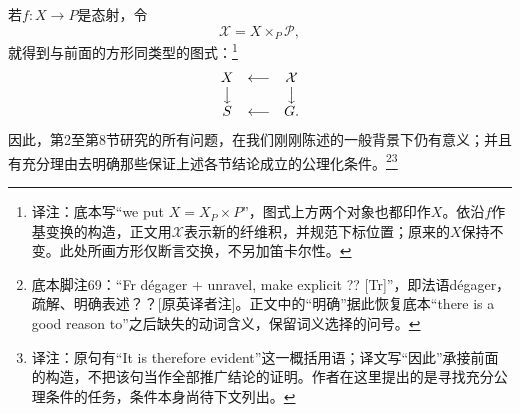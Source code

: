 \documentclass[openany,fontset=fandol]{ctexbook}
\newcommand{\note}[1]{\unskip\nobreak\footnote{译注：#1}}
\begin{document}
\newpage
若$f:X\to P$是态射，令
\[
\mathcal X=X\times_P\mathcal P,
\]
就得到与前面的方形同类型的图式：\note{底本写“we put $X=X_P\times P$”，图式上方两个对象也都印作$X$。依沿$f$作基变换的构造，正文用$\mathcal X$表示新的纤维积，并规范下标位置；原来的$X$保持不变。此处所画方形仅断言交换，不另加笛卡尔性。}
\[
\begin{array}{ccc}
X&\longleftarrow&\mathcal X\\
\big\downarrow&&\big\downarrow\\
S&\longleftarrow&G.
\end{array}
\]
因此，第2至第8节研究的所有问题，在我们刚刚陈述的一般背景下仍有意义；并且有充分理由去明确那些保证上述各节结论成立的公理化条件。\footnote{底本脚注69：“Fr dégager + unravel, make explicit ?? [Tr]”，即法语dégager，疏解、明确表述？？[原英译者注]。正文中的“明确”据此恢复底本“there is a good reason to”之后缺失的动词含义，保留词义选择的问号。}\note{原句有“It is therefore evident”这一概括用语；译文写“因此”承接前面的构造，不把该句当作全部推广结论的证明。作者在这里提出的是寻找充分公理条件的任务，条件本身尚待下文列出。}
\end{document}

